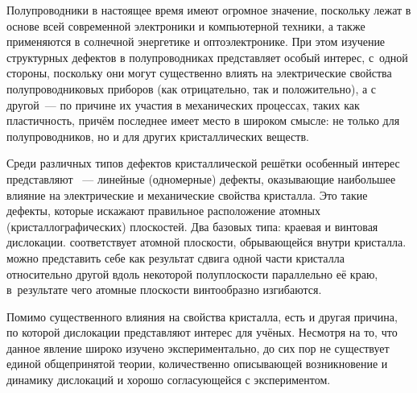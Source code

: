 \documentclass[a4paper, 14pt, titlepage]{extarticle}
\author{\theauthor,\\ кафедра физики и информационных систем КубГУ}
\title{\thetitle}
\date{\today{} \currenttime}
\begin{document}

  \maketitle


    \clearpage
    \tableofcontents


  \label{sec:intro}

  Полупроводники в настоящее время имеют огромное значение, поскольку лежат в основе всей
  современной электроники и компьютерной техники, а также применяются в солнечной энергетике и
  оптоэлектронике. При этом изучение структурных дефектов в полупроводниках представляет особый
  интерес, с~одной стороны, поскольку они могут существенно влиять на электрические свойства
  полупроводниковых приборов (как отрицательно, так и положительно), а с другой~--- по причине их
  участия в механических процессах, таких как пластичность, причём последнее имеет место в широком
  смысле: не только для полупроводников, но и для других кристаллических веществ.

  Среди различных типов дефектов кристаллической решётки особенный интерес представляют
  ~--- линейные (одномерные) дефекты, оказывающие наибольшее влияние на электрические и
  механические свойства кристалла. Это такие дефекты, которые искажают правильное расположение
  атомных (кристаллографических) плоскостей. Два базовых типа: краевая и винтовая дислокации.
   соответствует атомной плоскости, обрывающейся внутри кристалла.
   можно представить себе как результат сдвига одной
  части кристалла относительно другой вдоль некоторой полуплоскости параллельно её краю,
  в~результате чего атомные плоскости винтообразно изгибаются.

  Помимо существенного влияния на свойства кристалла, есть и другая причина, по которой
  дислокации представляют интерес для учёных. Несмотря на то, что данное явление широко изучено
  экспериментально, до сих пор не существует единой общепринятой теории, количественно описывающей
  возникновение и динамику дислокаций и хорошо согласующейся с экспериментом.
\end{document}
